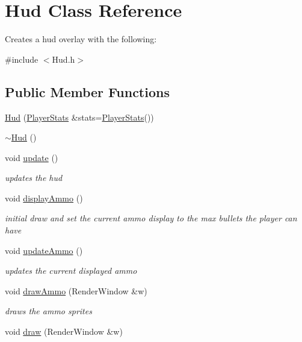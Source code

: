\hypertarget{class_hud}{}\section{Hud Class Reference}
\label{class_hud}


Creates a hud overlay with the following\+:  




{\ttfamily \#include $<$Hud.\+h$>$}

\subsection*{Public Member Functions}
\begin{DoxyCompactItemize}
\item 
\hyperlink{class_hud_a70b69eaa00542d46595069dafc768913}{Hud} (\hyperlink{struct_player_stats}{Player\+Stats} \&stats=\hyperlink{struct_player_stats}{Player\+Stats}())
\item 
\hyperlink{class_hud_a2fbb662bbc70f646e081f9206a879b66}{$\sim$\+Hud} ()
\item 
void \hyperlink{class_hud_af9ec2f89bcc54651d2413aeb5cbc53b3}{update} ()
\begin{DoxyCompactList}\small\item\em updates the hud \end{DoxyCompactList}\item 
void \hyperlink{class_hud_a4140716cb23f7cdd8436d7ebd77a85ab}{display\+Ammo} ()
\begin{DoxyCompactList}\small\item\em initial draw and set the current ammo display to the max bullets the player can have \end{DoxyCompactList}\item 
void \hyperlink{class_hud_a9fdcb19f4fd4d323dc7b3dd09bd85a08}{update\+Ammo} ()
\begin{DoxyCompactList}\small\item\em updates the current displayed ammo \end{DoxyCompactList}\item 
void \hyperlink{class_hud_a88e6f0b9be11e3aa59b7b4ab14d98ffa}{draw\+Ammo} (Render\+Window \&w)
\begin{DoxyCompactList}\small\item\em draws the ammo sprites \end{DoxyCompactList}\item 
void \hyperlink{class_hud_ad5832e2899c6b4606ce4229247fd7f9e}{draw} (Render\+Window \&w)

\end{DoxyCompactItemize}
